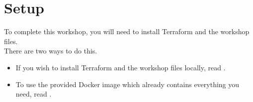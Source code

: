 \section{Setup}

To complete this workshop, you will need to install Terraform and the workshop
files.\\
There are two ways to do this.
\begin{itemize}
\item If you wish to install Terraform and the workshop files locally,
  read .
\item To use the provided Docker image which already contains everything you
  need, read .
\end{itemize}

